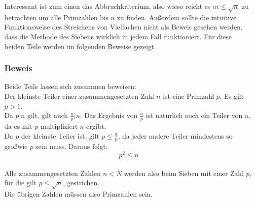 	Interessant ist zum einen das Abbruchkriterium, also wieso reicht es $m\leq \sqrt{n}$ zu betrachten um alle Primzahlen bis $n$ zu finden. Au\ss erdem sollte die intuitive Funktionsweise des Streichens von Vielfachen nicht als Beweis gesehen werden, dass die Methode des Siebens wirklich in jedem Fall funktioniert. F\"ur diese beiden Teile werden im folgenden Beweise gezeigt.

	\subsubsection{Beweis}
	Beide Teile lassen sich zusammen beweisen:\\
	Der kleinste Teiler einer zusammengesetzten Zahl $n$ ist eine Primzahl $p$. Es gilt $p>1$.\\
	Da $p | n$ gilt, gilt auch $\frac{n}{p}|n$. Das Ergebnis von $\frac{n}{p}$ ist nat\"urlich auch ein Teiler von $n$, da es mit $p$ multipliziert $n$ ergibt.\\
	Da $p$ der kleinste Teiler ist, gilt $p \leq \frac{n}{p}$, da jeder andere Teiler mindestens so gro\ss wie $p$ sein muss. Daraus folgt: $$p^2 \leq n$$\\
	Alle zusammengesetzten Zahlen $n < N$ werden also beim Sieben mit einer Zahl $p$, f\"ur die gilt $p \leq \sqrt{n}$, gestrichen.\\
	Die \"ubrigen Zahlen m\"ussen also Primzahlen sein.
